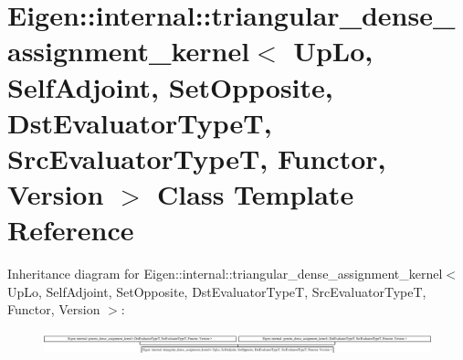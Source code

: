 \hypertarget{class_eigen_1_1internal_1_1triangular__dense__assignment__kernel_3_01_up_lo_00_01_self_adjoint_0bf432100a6648c0f02715a71126a9f44}{}\section{Eigen\+:\+:internal\+:\+:triangular\+\_\+dense\+\_\+assignment\+\_\+kernel$<$ Up\+Lo, Self\+Adjoint, Set\+Opposite, Dst\+Evaluator\+TypeT, Src\+Evaluator\+TypeT, Functor, Version $>$ Class Template Reference}
\label{class_eigen_1_1internal_1_1triangular__dense__assignment__kernel_3_01_up_lo_00_01_self_adjoint_0bf432100a6648c0f02715a71126a9f44}
Inheritance diagram for Eigen\+:\+:internal\+:\+:triangular\+\_\+dense\+\_\+assignment\+\_\+kernel$<$ Up\+Lo, Self\+Adjoint, Set\+Opposite, Dst\+Evaluator\+TypeT, Src\+Evaluator\+TypeT, Functor, Version $>$\+:\begin{figure}[H]
\begin{center}
\leavevmode
\includegraphics[height=0.657277cm]{class_eigen_1_1internal_1_1triangular__dense__assignment__kernel_3_01_up_lo_00_01_self_adjoint_0bf432100a6648c0f02715a71126a9f44}
\end{center}
\end{figure}
